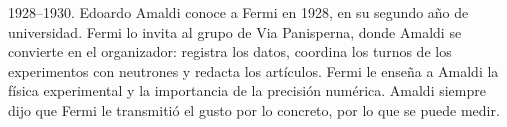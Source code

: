 \documentclass[11pt,a4paper]{article}
\begin{document}
1928--1930. Edoardo Amaldi conoce a Fermi en 1928, en su segundo año de universidad. Fermi lo invita al grupo de Via Panisperna, donde Amaldi se convierte en el organizador: registra los datos, coordina los turnos de los experimentos con neutrones y redacta los artículos. Fermi le enseña a Amaldi la física experimental y la importancia de la precisión numérica. Amaldi siempre dijo que Fermi le transmitió el gusto por lo concreto, por lo que se puede medir.
\end{document}
